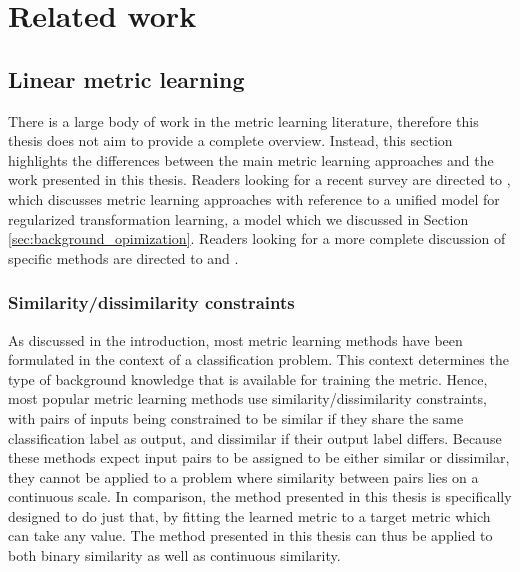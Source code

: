 \section{Related work}

\quad


\subsection{Linear metric learning}

There is a large body of work in the metric learning literature, therefore this thesis does not aim to provide a complete overview. Instead, this section highlights the differences between the main metric learning approaches and the work presented in this thesis. Readers looking for a recent survey are directed to \cite{kulis2012metric}, which discusses metric learning approaches with reference to a unified model for regularized transformation learning, a model which we discussed in Section \ref{sec:background_opimization}. Readers looking for a more complete discussion of specific methods are directed to \cite{bellet2013survey} and \cite{yang2006distance}.


\subsubsection{Similarity/dissimilarity constraints}

As discussed in the introduction, most metric learning methods have been formulated in the context of a classification problem. This context determines the type of background knowledge that is available for training the metric. Hence, most popular metric learning methods use similarity/dissimilarity constraints, with pairs of inputs being constrained to be similar if they share the same classification label as output, and dissimilar if their output label differs. \cite{davis2007information, guillaumin2009you, kostinger2012large} Because these methods expect input pairs to be assigned to be either similar or dissimilar, they cannot be applied to a problem where similarity between pairs lies on a continuous scale. In comparison, the method presented in this thesis is specifically designed to do just that, by fitting the learned metric to a target metric which can take any value. The method presented in this thesis can thus be applied to both binary similarity as well as continuous similarity.


